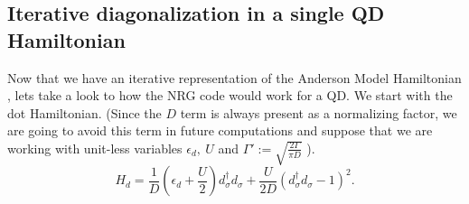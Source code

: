













\subsection{Iterative diagonalization in a single QD Hamiltonian \label{subsec:QD-Diag} }

Now that we have an iterative representation of the Anderson Model
Hamiltonian , lets take a look to
how the NRG code would work for a QD. We start with the dot Hamiltonian.
(Since the $D$ term is always present as a normalizing factor, we
are going to avoid this term in future computations and suppose that
we are working with unit-less variables $\epsilon_{d},\ U$ and $\Gamma':=\sqrt{\frac{2\Gamma}{\pi D}}$
).
\begin{equation}
H_{d}=\frac{1}{D}\left(\epsilon_{d}+\frac{U}{2}\right)d_{\sigma}^{\dagger}d_{\sigma}+\frac{U}{2D}(d_{\sigma}^{\dagger}d_{\sigma}-1)^{2}.\label{eq:DotHam}
\end{equation}


